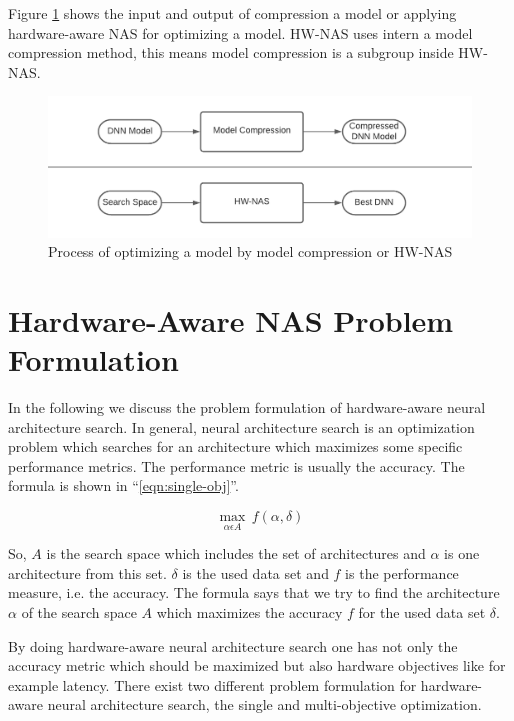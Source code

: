 \documentclass[conference]{IEEEtran}
\begin{document}
Figure \ref{fig:Optimization} \cite{bib1} shows the input and output of compression a model or applying hardware-aware NAS for optimizing a model. HW-NAS uses intern a model compression method, this means model compression is a subgroup inside HW-NAS.

\begin{figure}[htbp]
\centerline{\includegraphics[width=\linewidth]{Optimization.png}}
\caption{Process of optimizing a model by model compression or HW-NAS \cite{bib1}}
\label{fig:Optimization}
\end{figure}

\section{Hardware-Aware NAS Problem Formulation}
\label{section:ProblemFormulation}
In the following we discuss the problem formulation of hardware-aware neural architecture search. In general, neural architecture search is an optimization problem which searches for an architecture which maximizes some specific performance metrics. The performance metric is usually the accuracy. The formula is shown in ``\eqref{eqn:single-obj}''. 
 
\begin{equation}
\label{eqn:single-obj}
\max_{\alpha\epsilon A}\,f(\alpha, \delta)
\end{equation}

So, $A$ is the search space which includes the set of architectures and $\alpha$ is one architecture from this set. $\delta$ is the used data set and $f$ is the performance measure, i.e. the accuracy. The formula says that we try to find the architecture $\alpha$ of the search space $A$ which maximizes the accuracy $f$ for the used data set $\delta$. 
 
By doing hardware-aware neural architecture search one has not only the accuracy metric which should be maximized but also hardware objectives like for example latency. There exist two different problem formulation for hardware-aware neural architecture search, the single and multi-objective optimization.
\end{document}
